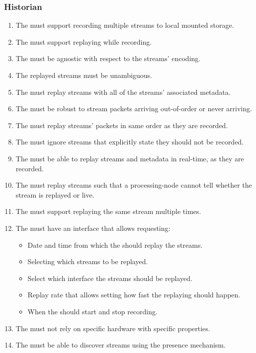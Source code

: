 \subsubsection*{Historian}
\begin{enumerate}
	\item The  must support recording multiple streams to local mounted storage.
	\item The  must support replaying while recording.
	\item The  must be agnostic with respect to the streams' encoding.
	\item The replayed streams must be unambiguous.
	\item The  must replay streams with all of the streams' associated metadata.
	\item The  must be robust to stream packets arriving out-of-order or never arriving.
	\item The  must replay streams' packets in same order as they are recorded.
	\item The  must ignore streams that explicitly state they should not be recorded.
	\item The  must be able to replay streams and metadata in real-time, as they are recorded.
	\item The  must replay streams such that a processing-node cannot tell whether the stream is replayed or live.
	\item The  must support replaying the same stream multiple times.
	\item The  must have an interface that allows requesting:
	\begin{itemize}
		\item Date and time from which the  should replay the streams.
		\item Selecting which streams to be replayed.
		\item Select which interface the streams should be replayed. 
		\item Replay rate that allows setting how fast the replaying should happen. 
		\item When the  should start and stop recording.
	\end{itemize}
	\item The  must not rely on specific hardware with specific properties.
	\item The  must be able to discover streams using the presence mechanism.
\end{enumerate}


